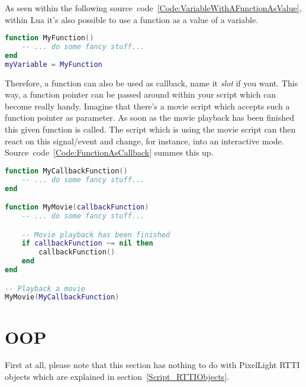 As seen within the following source~code~\ref{Code:VariableWithAFunctionAsValue}, within Lua it's also possible to use a function as a value of a variable.
\begin{lstlisting}[language=lua,float=htb,label=Code:VariableWithAFunctionAsValue,caption={Variable with a function as value}]
function MyFunction()
	-- ... do some fancy stuff...
end
myVariable = MyFunction
\end{lstlisting}
Therefore, a function can also be used as callback, name it \emph{slot} if you want. This way, a function pointer can be passed around within your script which can become really handy. Imagine that there's a movie script which accepts such a function pointer as parameter. As soon as the movie playback has been finished this given function is called. The script which is using the movie script can then react on this signal/event and change, for instance, into an interactive mode. Source~code~\ref{Code:FunctionAsCallback} summes this up.
\begin{lstlisting}[language=lua,float=htb,label=Code:FunctionAsCallback,caption={Function as callback}]
function MyCallbackFunction()
	-- ... do some fancy stuff...
end

function MyMovie(callbackFunction)
	-- ... do some fancy stuff...

	-- Movie playback has been finished
	if callbackFunction ~= nil then
		callbackFunction()
	end
end

-- Playback a movie
MyMovie(MyCallbackFunction)
\end{lstlisting}




\section{\ac{OOP}}
First at all, please note that this section has nothing to do with PixelLight \ac{RTTI} objects which are explained in section~\ref{Script_RTTIObjects}.

